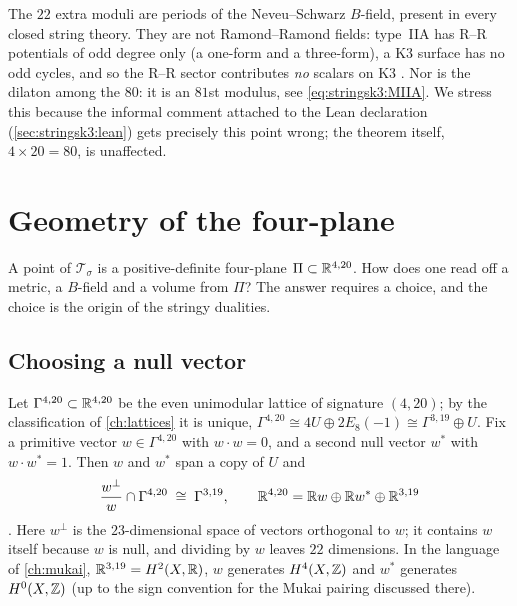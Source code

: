 \begin{pitfallbox}
The $22$ extra moduli are periods of the Neveu--Schwarz $B$-field, present in every closed
string theory. They are not Ramond--Ramond fields: type~IIA has R--R potentials of odd degree
only (a one-form and a three-form), a K3 surface has no odd cycles, and so the R--R sector
contributes \emph{no} scalars on K3 . Nor is the dilaton among
the $80$: it is an $81$st modulus, see \eqref{eq:stringsk3:MIIA}. We stress this because the
informal comment attached to the Lean declaration 
(\cref{sec:stringsk3:lean}) gets precisely this point wrong; the theorem itself, $4\times20=80$,
is unaffected.
\end{pitfallbox}

\section{Geometry of the four-plane}\label{sec:stringsk3:fourplane}

A point of $\mathcal T_\sigma$ is a positive-definite four-plane $\Pi\subset\mathbb{R}^{4,20}$. How does
one read off a metric, a $B$-field and a volume from $\Pi$? The answer requires a choice, and
the choice is the origin of the stringy dualities.

\subsection{Choosing a null vector}
Let $\Gamma^{4,20}\subset\mathbb{R}^{4,20}$ be the even unimodular lattice of signature $(4,20)$; by the
classification of \cref{ch:lattices} it is unique, $\Gamma^{4,20}\cong4U\oplus2E_8(-1)
\cong\Gamma^{3,19}\oplus U$. Fix a primitive vector $w\in\Gamma^{4,20}$ with $w\cdot w=0$, and a
second null vector $w^*$ with $w\cdot w^*=1$. Then $w$ and $w^*$ span a copy of $U$ and
\begin{equation}\label{eq:stringsk3:wperp}
  \frac{w^\perp}{w}\cap\Gamma^{4,20}\;\cong\;\Gamma^{3,19},\qquad
  \mathbb{R}^{4,20}=\mathbb{R} w\oplus\mathbb{R} w^*\oplus\mathbb{R}^{3,19}
\end{equation}
. Here $w^\perp$ is the $23$-dimensional space of
vectors orthogonal to $w$; it contains $w$ itself because $w$ is null, and dividing by $w$
leaves $22$ dimensions. In the language of \cref{ch:mukai}, $\mathbb{R}^{3,19}=H^2(X,\mathbb{R})$, $w$ generates
$H^4(X,\mathbb{Z})$ and $w^*$ generates $H^0(X,\mathbb{Z})$ (up to the sign convention for the Mukai pairing
discussed there).

